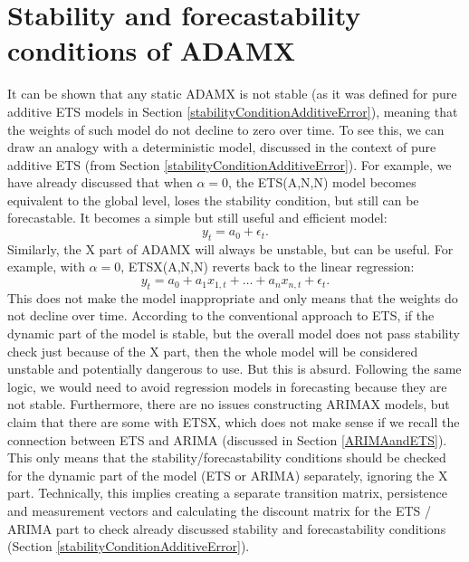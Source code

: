 \documentclass[
]{book}
\theoremstyle{definition}
\theoremstyle{definition}
\theoremstyle{definition}
\theoremstyle{definition}
\theoremstyle{remark}
\begin{document}
\hypertarget{stability-and-forecastability-conditions-of-adamx}{%
\section{Stability and forecastability conditions of ADAMX}\label{stability-and-forecastability-conditions-of-adamx}}

It can be shown that any static ADAMX is not stable (as it was defined for pure additive ETS models in Section \ref{stabilityConditionAdditiveError}), meaning that the weights of such model do not decline to zero over time. To see this, we can draw an analogy with a deterministic model, discussed in the context of pure additive ETS (from Section \ref{stabilityConditionAdditiveError}). For example, we have already discussed that when \(\alpha=0\), the ETS(A,N,N) model becomes equivalent to the global level, loses the stability condition, but still can be forecastable. It becomes a simple but still useful and efficient model:
\begin{equation}
  y_{t} = a_0 + \epsilon_t .
  \label{eq:ADAMETSGlobalLevelSimple}
\end{equation}
Similarly, the X part of ADAMX will always be unstable, but can be useful. For example, with \(\alpha=0\), ETSX(A,N,N) reverts back to the linear regression:
\begin{equation}
  y_{t} = a_0 + a_{1} x_{1,t} + \dots + a_n x_{n,t} + \epsilon_t .
  \label{eq:ADAMETSXRegression}
\end{equation}
This does not make the model inappropriate and only means that the weights do not decline over time. According to the conventional approach to ETS, if the dynamic part of the model is stable, but the overall model does not pass stability check just because of the X part, then the whole model will be considered unstable and potentially dangerous to use. But this is absurd. Following the same logic, we would need to avoid regression models in forecasting because they are not stable. Furthermore, there are no issues constructing ARIMAX models, but \citet{Hyndman2008b} claim that there are some with ETSX, which does not make sense if we recall the connection between ETS and ARIMA (discussed in Section \ref{ARIMAandETS}). This only means that the stability/forecastability conditions should be checked for the dynamic part of the model (ETS or ARIMA) separately, ignoring the X part. Technically, this implies creating a separate transition matrix, persistence and measurement vectors and calculating the discount matrix for the ETS / ARIMA part to check already discussed stability and forecastability conditions (Section \ref{stabilityConditionAdditiveError}).
\end{document}
